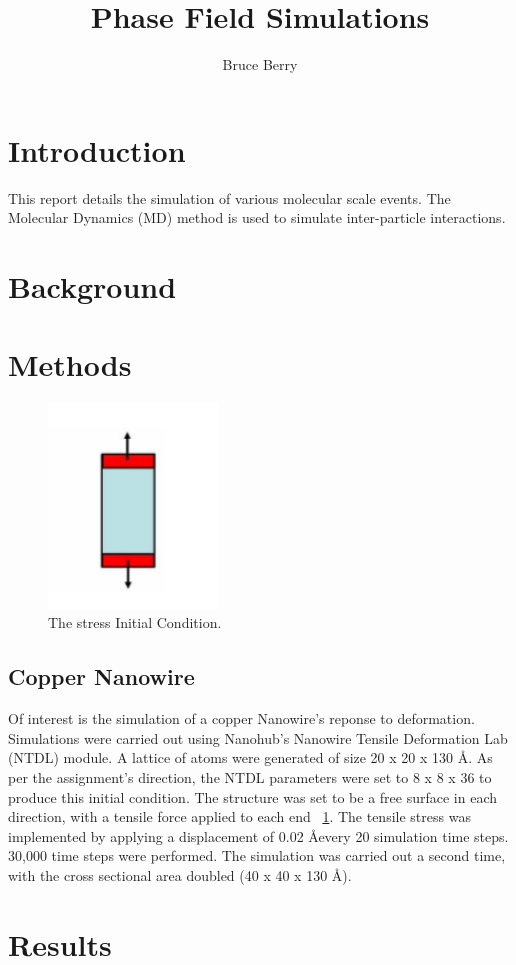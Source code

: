 \documentclass{report}
\begin{document}
    \title{Phase Field Simulations}
    \author{Bruce Berry}
    \maketitle

    \section{Introduction}
    This report details the simulation of various molecular scale events.  The Molecular Dynamics (MD) method is used to simulate inter-particle interactions.

    \section{Background}

    \section{Methods}
        \begin{figure}[!htb]
            \label{fig:applied-stress}
            \centering
            \includegraphics[width=0.4\textwidth]{applied-stress.png}
            \caption{The stress Initial Condition.}
        \end{figure}

        \subsection{Copper Nanowire}
        Of interest is the simulation of a copper Nanowire's reponse to deformation.  Simulations were carried out using Nanohub's Nanowire Tensile Deformation Lab (NTDL) module.  A lattice of atoms were generated of size 20 x 20 x 130 \AA. As per the assignment's direction, the NTDL parameters were set to 8 x 8 x 36 to produce this initial condition.  The structure was set to be a free surface in each direction, with a tensile force applied to each end ~\ref{fig:applied-stress}.  The tensile stress was implemented by applying a displacement of 0.02 \AA every 20 simulation time steps. 30,000 time steps were performed.  The simulation was carried out a second time, with the cross sectional area doubled (40 x 40 x 130 \AA).

          

    \section{Results}
\end{document}
